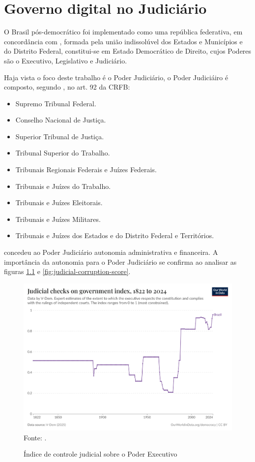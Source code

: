 \chapter{Governo digital no Judiciário}

O Brasil pós-democrático foi implementado como uma república  federativa, em concordância com \cite{cf88}, formada pela união indissolúvel dos Estados e Municípios e do Distrito Federal, constitui-se em Estado Democrático de Direito, cujos Poderes são o Executivo, Legislativo e Judiciário.

Haja vista o foco deste trabalho é o Poder Judiciário, o Poder Judiciáiro é composto, segundo \cite{cf88}, no art. 92 da CRFB:

\begin{itemize}
    \item Supremo Tribunal Federal.
    \item Conselho Nacional de Justiça.
    \item Superior Tribunal de Justiça.
    \item Tribunal Superior do Trabalho.
    \item Tribunais Regionais Federais e Juízes Federais.
    \item Tribunais e Juízes do Trabalho.
    \item Tribunais e Juízes Eleitorais.
    \item Tribunais e Juízes Militares.
    \item  Tribunais e Juízes dos Estados e do Distrito Federal e Territórios.
\end{itemize}

\cite{cf88} concedeu ao Poder Judiciário autonomia administrativa e financeira. A importância da autonomia para o Poder Judiciário se confirma ao analisar as figuras \ref{fig:jus_constraints_on_gov} e \ref{fig:judicial-corruption-score}.

\begin{figure}[H]
    \centering
    \caption{Índice de controle judicial sobre o Poder Executivo}
    \includegraphics[width=1\linewidth]{figuras/judicial-constraints-on-the-executive-index.png}
    \label{fig:jus_constraints_on_gov}
    \footnotesize{Fonte: \cite{jus_constraints_on_gov}.}
\end{figure}

